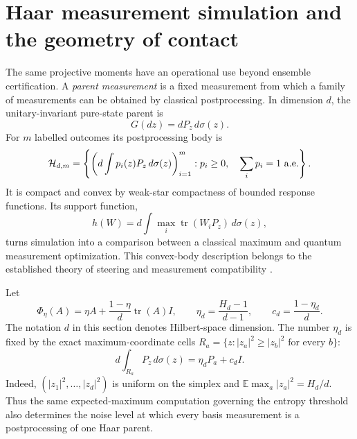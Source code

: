\section{Haar measurement simulation and the geometry of contact}
\label{geo:qutrit}

The same projective moments have an operational use beyond ensemble
certification. A \emph{parent measurement} is a fixed measurement from
which a family of measurements can be obtained by classical
postprocessing. In dimension \(d\), the unitary-invariant pure-state
parent is
\[
 G(dz)=dP_z\,d\sigma(z).
\]
For \(m\) labelled outcomes its postprocessing body is
\[
 \mathcal H_{d,m}=
 \left\{\left(d\int p_i(z)P_z\,d\sigma(z)\right)_{i=1}^m:
      p_i\ge0,\quad\sum_i p_i=1\ {\rm a.e.}\right\}.
\]
It is compact and convex by weak-star compactness of bounded response
functions. Its support function,
\[
 h(W)=d\int\max_i\operatorname{tr}(W_iP_z)\,d\sigma(z),
 \label{geo:haar-support}
\]
turns simulation into a comparison between a classical maximum and
quantum measurement optimization. This convex-body description belongs
to the established theory of steering and measurement compatibility
\cite{geo_nguyen2018}.

Let
\[
 \Phi_\eta(A)=\eta A+\frac{1-\eta}{d}\operatorname{tr}(A)I,\qquad
 \eta_d=\frac{H_d-1}{d-1},\qquad c_d=\frac{1-\eta_d}{d}.
\]
The notation \(d\) in this section denotes Hilbert-space dimension.
The number \(\eta_d\) is fixed by the exact maximum-coordinate cells
\(R_a=\{z:|z_a|^2\ge|z_b|^2\text{ for every }b\}\):
\begin{equation}
 d\int_{R_a}P_z\,d\sigma(z)=\eta_d P_a+c_dI.
 \label{geo:haar-cell}
\end{equation}
Indeed, \((|z_1|^2,\ldots,|z_d|^2)\) is uniform on the simplex and
\(\mathbb E\max_a|z_a|^2=H_d/d\).
Thus the same expected-maximum computation governing the entropy
threshold also determines the noise level at which every basis
measurement is a postprocessing of one Haar parent.


